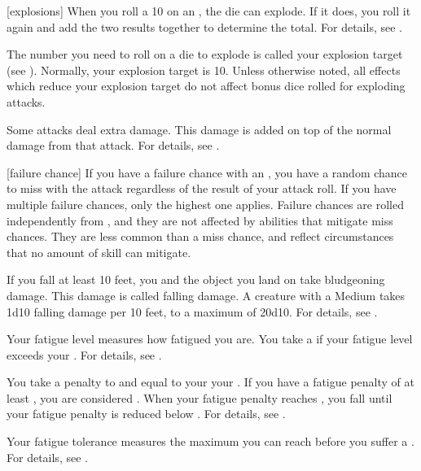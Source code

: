 [explosions] When you roll a 10 on an , the die can explode.
If it does, you roll it again and add the two results together to determine the total.
For details, see .

 The number you need to roll on a die to explode is called your explosion target (see ).
Normally, your explosion target is 10.
Unless otherwise noted, all effects which reduce your explosion target do not affect bonus dice rolled for exploding attacks.

 Some attacks deal extra damage.
This damage is added on top of the normal damage from that attack.
For details, see .

[failure chance] If you have a failure chance with an , you have a random chance to miss with the attack regardless of the result of your attack roll.
If you have multiple failure chances, only the highest one applies.
Failure chances are rolled independently from , and they are not affected by abilities that mitigate miss chances.
They are less common than a miss chance, and reflect circumstances that no amount of skill can mitigate.

 If you fall at least 10 feet, you and the object you land on take bludgeoning damage.
This damage is called falling damage.
A creature with a Medium  takes 1d10 falling damage per 10 feet, to a maximum of 20d10.
For details, see .

 Your fatigue level measures how fatigued you are.
You take a  if your fatigue level exceeds your .
For details, see .

 You take a penalty to  and  equal to your  \sub your .
If you have a fatigue penalty of at least , you are considered .
When your fatigue penalty reaches , you fall \unconscious until your fatigue penalty is reduced below .
For details, see .

 Your fatigue tolerance measures the maximum  you can reach before you suffer a .
For details, see .

